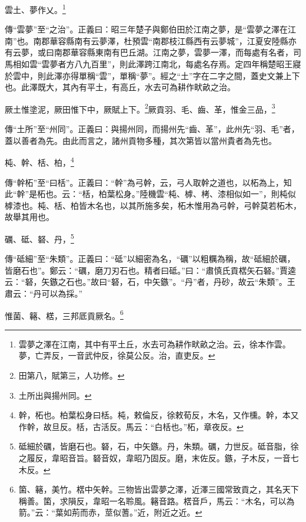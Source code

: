 雲土、夢作乂。\footnote{雲夢之澤在江南，其中有平土丘，水去可為耕作畎畝之治。云，徐本作雲。夢，亡弄反，一音武仲反，徐莫公反。治，直吏反。}

{\noindent\zhuan{}\fzbyks 傳“雲夢”至“之治”。正義曰：昭三年楚子與鄭伯田於江南之夢，是“雲夢之澤在江南”也。南郡華容縣南有云夢澤，杜預雲“南郡枝江縣西有云夢城”，江夏安陸縣亦有云夢，或曰南郡華容縣東南有巴丘湖。江南之夢，雲夢一澤，而每處有名者，司馬相如雲“雲夢者方八九百里”，則此澤跨江南北，每處名存焉。定四年稱楚昭王寢於雲中，則此澤亦得單稱“雲”，單稱“夢”。經之“土”字在二字之間，蓋史文兼上下也。此澤既大，其內有平土，有高丘，水去可為耕作畎畝之治。 \par}

厥土惟塗泥，厥田惟下中，厥賦上下。\footnote{田第八，賦第三，人功修。}厥貢羽、毛、齒、革，惟金三品，\footnote{土所出與揚州同。}

{\noindent\zhuan{}\fzbyks 傳“土所”至“州同”。正義曰：與揚州同，而揚州先“齒、革”，此州先“羽、毛”者，蓋以善者為先。由此而言之，諸州貢物多種，其次第皆以當州貴者為先也。 \par}

杶、幹、栝、柏，\footnote{幹，柘也。柏葉松身曰栝。杶，敕倫反，徐敕荀反，木名，又作櫄。幹，本又作幹，故旦反。栝，古活反。馬云：“白栝也。”柘，章夜反。}

{\noindent\zhuan{}\fzbyks 傳“幹柘”至“曰栝”。正義曰：“幹”為弓幹，云，弓人取幹之道也，以柘為上，知此“幹”是柘也。云：“栝，柏葉松身。”陸機雲“杶、㯉、栲、漆相似如一”，則杶似㯉漆也。杶、栝、柏皆木名也，以其所施多矣，柘木惟用為弓幹，弓幹莫若柘木，故舉其用也。 \par}

礪、砥、砮、丹，\footnote{砥細於礪，皆磨石也。砮，石，中矢鏃。丹，朱類。礪，力世反。砥音脂，徐之履反，韋昭音旨。砮音奴，韋昭乃固反。磨，末佐反。鏃，子木反，一音七木反。}

{\noindent\zhuan{}\fzbyks 傳“砥細”至“朱類”。正義曰：“砥”以細密為名，“礪”以粗糲為稱，故“砥細於礪，皆磨石也”。鄭云：“礪，磨刀刃石也。精者曰砥。”曰：“肅慎氏貢楛矢石砮。”賈逵云：“砮，矢鏃之石也。”故曰“砮，石，中矢鏃”。“丹”者，丹砂，故云“朱類”。王肅云：“丹可以為採。” \par}

惟菌、簵、楛，三邦厎貢厥名。\footnote{箘、簵，美竹。楛中矢幹。三物皆出雲夢之澤，近澤三國常致貢之，其名天下稱善。箘，求隕反，韋昭一名聆風。簵音路。楛音戶，馬云：“木名，可以為箭。”云：“葉如荊而赤，莖似蓍。”近，附近之近。}

